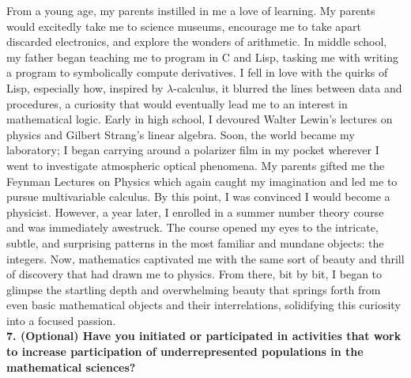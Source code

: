 \documentclass[11pt]{article}
\begin{document}
From a young age, my parents instilled in me a love of learning. My parents would excitedly take me to science museums, encourage me to take apart discarded electronics, and explore the wonders of arithmetic. In middle school, my father began teaching me to program in C and Lisp, tasking me with writing a program to symbolically compute derivatives. I fell in love with the quirks of Lisp, especially how, inspired by $\lambda$-calculus, it blurred the lines between data and procedures, a curiosity that would eventually lead me to an interest in mathematical logic. Early in high school, I devoured Walter Lewin’s lectures on physics and Gilbert Strang's linear algebra. Soon, the world became my laboratory; I began carrying around a polarizer film in my pocket wherever I went to investigate atmospheric optical phenomena. My parents gifted me the Feynman Lectures on Physics which again caught my imagination and led me to pursue multivariable calculus. By this point, I was convinced I would become a physicist. However, a year later, I enrolled in a summer number theory course and was immediately awestruck. The course opened my eyes to the intricate, subtle, and surprising patterns in the most familiar and mundane objects: the integers. Now, mathematics captivated me with the same sort of beauty and thrill of discovery that had drawn me to physics. From there, bit by bit, I began to glimpse the startling depth and overwhelming beauty that springs forth from even basic mathematical objects and their interrelations, solidifying this curiosity into a focused passion. 
\bigskip\\
\noindent \textbf{7. (Optional) Have you initiated or participated in activities that work to increase participation of underrepresented populations in the mathematical sciences?}
\bigskip\\
\end{document}
